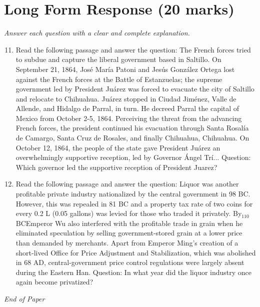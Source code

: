 \documentclass[12pt]{article}
\begin{document}
\section*{Long Form Response (20 marks)}
\textit{Answer each question with a clear and complete explanation.}
\begin{enumerate}[label=\arabic*.]
\setcounter{enumi}{10}
\item Read the following passage and answer the question: The French forces tried to subdue and capture the liberal government based in Saltillo. On September 21, 1864, José María Patoni and Jesús González Ortega lost against the French forces at the Battle of Estanzuelas; the supreme government led by President Juárez was forced to evacuate the city of Saltillo and relocate to Chihuahua. Juárez stopped in Ciudad Jiménez, Valle de Allende, and Hidalgo de Parral, in turn. He decreed Parral the capital of Mexico from October 2-5, 1864. Perceiving the threat from the advancing French forces, the president continued his evacuation through Santa Rosalía de Camargo, Santa Cruz de Rosales, and finally Chihuahua, Chihuahua. On October 12, 1864, the people of the state gave President Juárez an overwhelmingly supportive reception, led by Governor Ángel Trí... Question: Which governor led the supportive reception of President Juarez?
\item Read the following passage and answer the question: Liquor was another profitable private industry nationalized by the central government in 98 BC. However, this was repealed in 81 BC and a property tax rate of two coins for every 0.2 L (0.05 gallons) was levied for those who traded it privately. By$_{110}$BCEmperor Wu also interfered with the profitable trade in grain when he eliminated speculation by selling government-stored grain at a lower price than demanded by merchants. Apart from Emperor Ming's creation of a short-lived Office for Price Adjustment and Stabilization, which was abolished in 68 AD, central-government price control regulations were largely absent during the Eastern Han. Question: In what year did the liquor industry once again become privatized?
\end{enumerate}

\vfill
\noindent\textit{End of Paper}
\end{document}
